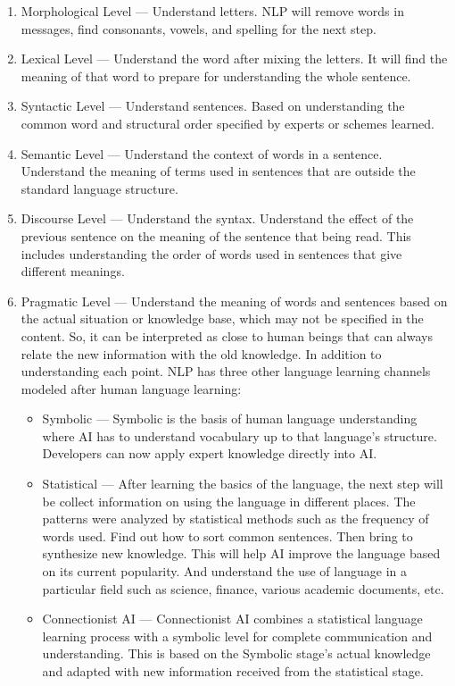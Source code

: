 \documentclass[12pt,oneside,openright,a4paper]{cpe-english-project}
\begin{document}
\begin{enumerate}
  \item Morphological Level — Understand letters. NLP will remove words in messages, find consonants,
  vowels, and spelling for the next step.
  \item Lexical Level — Understand the word after mixing the letters. It will find the meaning
  of that word to prepare for understanding the whole sentence.
  \item Syntactic Level — Understand sentences. Based on understanding the common word and structural
  order specified by experts or schemes learned.
  \item Semantic Level — Understand the context of words in a sentence. Understand the meaning of terms
  used in sentences that are outside the standard language structure.
  \item Discourse Level — Understand the syntax. Understand the effect of the previous sentence on the
  meaning of the sentence that being read. This includes understanding the order of words used in sentences
  that give different meanings.
  \item Pragmatic Level — Understand the meaning of words and sentences based on the actual situation
  or knowledge base, which may not be specified in the content. So, it can be interpreted as close to
  human beings that can always relate the new information with the old knowledge. In addition to
  understanding each point. NLP has three other language learning channels modeled after human language learning:
  \begin{itemize}
    \item Symbolic  — Symbolic is the basis of human language understanding where AI has to understand vocabulary up
    to that language's structure. Developers can now apply expert knowledge directly into AI.
    \item Statistical — After learning the basics of the language, the next step will be collect information
    on using the language in different places. The patterns were analyzed by statistical methods such as the
    frequency of words used. Find out how to sort common sentences. Then bring to synthesize new knowledge.
    This will help AI improve the language based on its current popularity. And understand the use of language
    in a particular field such as science, finance, various academic documents, etc.
    \item Connectionist AI — Connectionist AI combines a statistical language learning process with a symbolic level for complete
    communication and understanding. This is based on the Symbolic stage's actual knowledge and adapted with new
    information received from the statistical stage.
    
  \end{itemize}
\end{enumerate}
\end{document}

